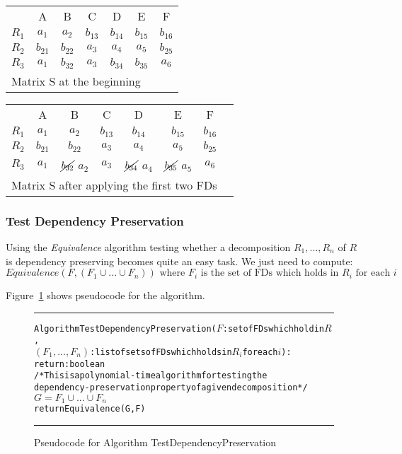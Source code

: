 \footnotesize
\hspace*{-0.5cm}\begin{minipage}[t]{0.5\linewidth}\centering
\begin{tabular}[h]{c|c|c|c|c|c|c|}
  \cline{2-7}
  & A & B & C & D & E & F \\
  \cline{2-7}
  \cline{2-7}
  $R_1$ & $a_{1}$ & $a_2$ & $b_{13}$ & $b_{14}$ & $b_{15}$ & $b_{16}$ \\
  $R_2$ & $b_{21}$ & $b_{22}$ & $a_{3}$ & $a_4$ & $a_5$ & $b_{25}$ \\
  $R_3$ & $a_1$ & $b_{32}$ & $a_{3}$ & $b_{34}$ & $b_{35}$ & $a_6$ \\
  \cline{2-7}
  \multicolumn{7}{l}{Matrix S at the beginning}
\end{tabular}
\end{minipage}
\hspace*{-0.5cm}
\begin{minipage}[t]{0.5\linewidth}\centering
\begin{tabular}[h]{c|c|c|c|c|c|c|c}
  \cline{2-7}
  & A & B & C & D & E & F \\
  \cline{2-7}
  \cline{2-7}
  $R_1$ & $a_{1}$ & $a_2$ & $b_{13}$ & $b_{14}$ & $b_{15}$ & $b_{16}$ \\
  $R_2$ & $b_{21}$ & $b_{22}$ & $a_{3}$ & $a_4$ & $a_5$ & $b_{25}$ \\
  $R_3$ & $a_1$ & $\cancel{b_{32}}$ $a_2$ & $a_{3}$ & $\cancel{b_{34}}$ $a_4$ &$\cancel{b_{35}}$ $a_5$ & $a_6$ \\
  \cline{2-7}
  \multicolumn{8}{l}{Matrix S after applying the first two FDs} \\
\end{tabular}
\end{minipage}
\normalsize

\subsubsection{Test Dependency Preservation} 
Using the \textit{Equivalence} algorithm testing whether a decomposition 
$R_1,...,R_n$ of $R$ is dependency preserving
becomes quite an easy task. We just need to compute: 
\[
  Equivalence(F, (F_1 \cup ... \cup F_n)) \mbox{ where } F_i \mbox{ is the set of FDs which holds in } R_i \mbox{ for each } i 
\] 

Figure~\ref{fig:dptest} shows pseudocode for the algorithm.

\begin{figure}[htbp]
\hrule
\begin{alltt}

Algorithm TestDependencyPreservation(\(F\): set of FDs which hold in \(R\),
           \((F_1,...,F_n)\): list of sets of FDs which holds in \(R_i\) for each \(i\)):
          return: boolean
/* This is a polynomial-time algorithm for testing the 
dependency-preservation property of a given decomposition */
  \(G = F_1 \cup ... \cup F_n\)
  return Equivalence(G,F)
\end{alltt}
\caption{Pseudocode for Algorithm TestDependencyPreservation}\label{fig:dptest}
\hrule
\end{figure}

